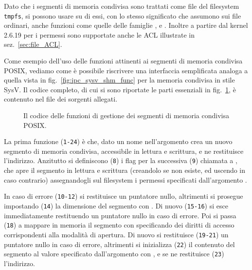 Dato che i segmenti di memoria condivisa sono trattati come file del
filesystem \texttt{tmpfs}, si possono usare su di essi, con lo stesso
significato che assumono sui file ordinari, anche funzioni come quelle delle
famiglie ,  e . Inoltre a partire dal
kernel 2.6.19 per i permessi sono supportate anche le ACL illustrate in
sez.~\ref{sec:file_ACL}.

Come esempio dell'uso delle funzioni attinenti ai segmenti di memoria
condivisa POSIX, vediamo come è possibile riscrivere una interfaccia
semplificata analoga a quella vista in fig.~\ref{fig:ipc_sysv_shm_func} per la
memoria condivisa in stile SysV. Il codice completo, di cui si sono riportate
le parti essenziali in fig.~\ref{fig:ipc_posix_shmmem}, è contenuto nel file
 dei sorgenti allegati.

\begin{figure}[!htb]
  \footnotesize \centering
  \begin{minipage}[c]{\codesamplewidth}
  \end{minipage} 
  \normalsize 
  \caption{Il codice delle funzioni di gestione dei segmenti di memoria
    condivisa POSIX.}
  \label{fig:ipc_posix_shmmem}
\end{figure}

La prima funzione (\texttt{\small 1-24}) è  che, dato un nome
nell'argomento  crea un nuovo segmento di memoria condivisa,
accessibile in lettura e scrittura, e ne restituisce l'indirizzo. Anzitutto si
definiscono (\texttt{\small 8}) i flag per la successiva (\texttt{\small 9})
chiamata a , che apre il segmento in lettura e scrittura
(creandolo se non esiste, ed uscendo in caso contrario) assegnandogli sul
filesystem i permessi specificati dall'argomento . 

In caso di errore (\texttt{\small 10-12}) si restituisce un puntatore nullo,
altrimenti si prosegue impostando (\texttt{\small 14}) la dimensione del
segmento con . Di nuovo (\texttt{\small 15-16}) si esce
immediatamente restituendo un puntatore nullo in caso di errore. Poi si passa
(\texttt{\small 18}) a mappare in memoria il segmento con 
specificando dei diritti di accesso corrispondenti alla modalità di apertura.
Di nuovo si restituisce (\texttt{\small 19-21}) un puntatore nullo in caso di
errore, altrimenti si inizializza (\texttt{\small 22}) il contenuto del
segmento al valore specificato dall'argomento  con , e
se ne restituisce (\texttt{\small 23}) l'indirizzo.

